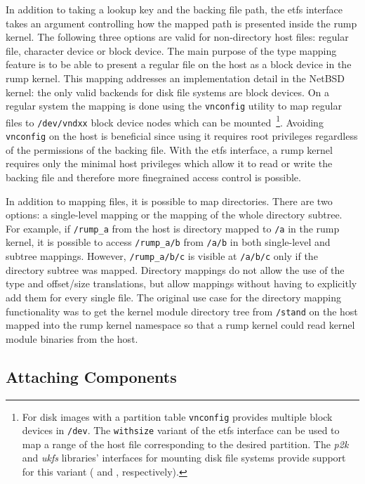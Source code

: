 In addition to taking a lookup key and the backing file path, the
etfs interface takes an argument controlling how the mapped path
is presented inside the rump kernel.  The following three options
are valid for non-directory host files: regular file, character
device or block device.
The main purpose of the type mapping feature is to be able
to present a regular file on the host as a block device in the rump
kernel.  This mapping addresses an implementation detail in the NetBSD
kernel: the only valid backends for disk file systems are block
devices.  On a regular system the mapping is done using the
\texttt{vnconfig} utility to map regular files to \texttt{/dev/vndxx}
block device nodes which can be mounted~\footnote
{
	For disk images with a partition table \texttt{vnconfig}
	provides multiple block devices in \texttt{/dev}.  The
	\texttt{withsize} variant of the etfs interface can be used
	to map a range of the host file corresponding to the desired
	partition.  The \textit{p2k} and \textit{ukfs} libraries'
	interfaces for mounting disk file systems provide support
	for this variant ( and
	, respectively).
}.
Avoiding \texttt{vnconfig} on the host is beneficial since using
it requires root privileges regardless of the permissions of the
backing file.  With the etfs interface, a rump kernel requires only
the minimal host privileges which allow it to read or write the
backing file and therefore more finegrained access control is
possible.

In addition to mapping files, it is possible to map directories.
There are two options: a single-level mapping or the mapping of
the whole directory subtree.  For example, if \verb+/rump_a+ from
the host is directory mapped to \verb+/a+ in the rump kernel, it
is possible to access \verb+/rump_a/b+ from \verb+/a/b+ in both
single-level and subtree mappings.  However, \verb+/rump_a/b/c+ is
visible at \verb+/a/b/c+ only if the directory subtree was mapped.
Directory mappings do not allow the use of the type and offset/size
translations, but allow mappings without having to explicitly add
them for every single file.
The original use case for the directory mapping functionality was
to get the kernel module directory tree from \texttt{/stand} on
the host mapped into the rump kernel namespace so that a rump kernel
could read kernel module binaries from the host.

\subsection{Attaching Components}

